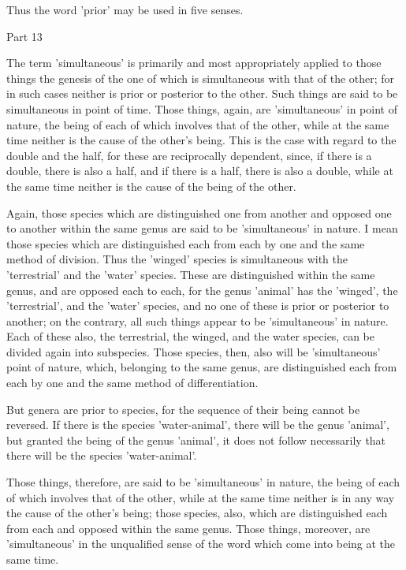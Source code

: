 Thus the word 'prior' may be used in five senses.



Part 13

The term 'simultaneous' is primarily and most appropriately applied to
those things the genesis of the one of which is simultaneous with that
of the other; for in such cases neither is prior or posterior to the
other. Such things are said to be simultaneous in point of time. Those
things, again, are 'simultaneous' in point of nature, the being of each
of which involves that of the other, while at the same time neither is
the cause of the other's being. This is the case with regard to the
double and the half, for these are reciprocally dependent, since, if
there is a double, there is also a half, and if there is a half, there
is also a double, while at the same time neither is the cause of the
being of the other.

Again, those species which are distinguished one from another and
opposed one to another within the same genus are said to be
'simultaneous' in nature. I mean those species which are distinguished
each from each by one and the same method of division. Thus the
'winged' species is simultaneous with the 'terrestrial' and the 'water'
species. These are distinguished within the same genus, and are opposed
each to each, for the genus 'animal' has the 'winged', the
'terrestrial', and the 'water' species, and no one of these is prior or
posterior to another; on the contrary, all such things appear to be
'simultaneous' in nature. Each of these also, the terrestrial, the
winged, and the water species, can be divided again into subspecies.
Those species, then, also will be 'simultaneous' point of nature,
which, belonging to the same genus, are distinguished each from each by
one and the same method of differentiation.

But genera are prior to species, for the sequence of their being cannot
be reversed. If there is the species 'water-animal', there will be the
genus 'animal', but granted the being of the genus 'animal', it does
not follow necessarily that there will be the species 'water-animal'.

Those things, therefore, are said to be 'simultaneous' in nature, the
being of each of which involves that of the other, while at the same
time neither is in any way the cause of the other's being; those
species, also, which are distinguished each from each and opposed
within the same genus. Those things, moreover, are 'simultaneous' in
the unqualified sense of the word which come into being at the same
time.



